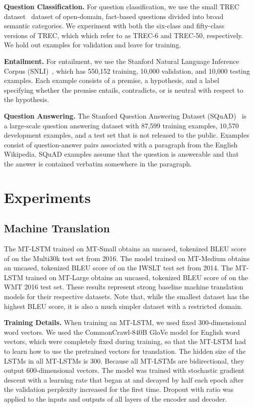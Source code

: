 \documentclass{article}
\begin{document}
\textbf{Question Classification.} 
For question classification, 
we use the small TREC dataset~\citep{voorhees1999trec} dataset of open-domain, fact-based questions divided into broad semantic categories.
We experiment with both the six-class and fifty-class versions of TREC,
which which refer to as TREC-6 and TREC-50, respectively.
We hold out  examples for validation and leave  for training.

\textbf{Entailment.}
For entailment, 
we use the Stanford Natural Language Inference Corpus (SNLI)~\citep{bowman2015snli}, 
which has 550,152 training, 
10,000 validation,
and 10,000 testing examples.
Each example consists of a premise, 
a hypothesis, 
and a label specifying whether the premise entails, contradicts, 
or is neutral with respect to the hypothesis.

\textbf{Question Answering.}
The Stanford Question Answering Dataset
(SQuAD)~\citep{rajpurkar2016squad} 
is a large-scale question answering dataset 
with 87,599 training examples,
10,570 development examples,
and a test set that is not released to the public.
Examples consist of question-answer pairs associated with a paragraph from the English Wikipedia.
SQuAD examples assume that the question is answerable and that the answer is contained verbatim somewhere in the paragraph.
 \section{Experiments}
\subsection{Machine Translation}
The MT-LSTM trained on MT-Small obtains an uncased,
tokenized BLEU score of  on the Multi30k test set from 2016.
The model trained on MT-Medium obtains an uncased, 
tokenized BLEU score of  on the IWSLT test set from 2014.
The MT-LSTM trained on MT-Large obtains an uncased, 
tokenized BLEU score of  on the WMT 2016 test set.
These results represent strong baseline machine translation models for their respective datasets. 
Note that, while the smallest dataset has the highest BLEU score, 
it is also a much simpler dataset with a restricted domain.

\textbf{Training Details. } 
When training an MT-LSTM,
we used fixed 300-dimensional word vectors.
We used the CommonCrawl-840B GloVe model for English word vectors,
which were completely fixed during training,
so that the MT-LSTM had to learn how to use the pretrained vectors for translation.
The hidden size of the LSTMs in all MT-LSTMs is 300. 
Because all MT-LSTMs are bidirectional,
they output 600-dimensional vectors.
The model was trained with stochastic gradient descent with a learning rate that began at  and decayed by half each epoch after the validation perplexity increased for the first time.
Dropout with ratio  was applied to the inputs and outputs of all layers of the encoder and decoder.
\end{document}
